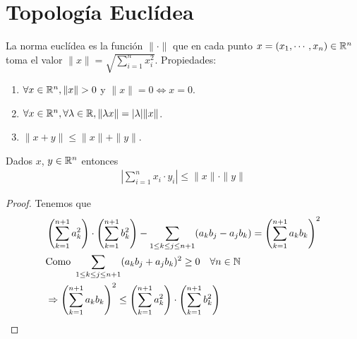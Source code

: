 \section{Topología Euclídea}

\begin{definition}
  La norma euclídea es la función \(\| \cdot \|\) que en cada punto \(x = (x_1, \cdots, x_n) \in \mathbb{R}^n\) toma el valor \(\|x\| = \sqrt{\sum_{i = 1}^n x_i^2}\).
  Propiedades: \begin{enumerate}
    \item \(\forall x \in \mathbb{R}^n, \|x\| > 0\) y \(\|x\| = 0 \iff x = 0\).
    \item \(\forall x \in \mathbb{R}^n, \forall \lambda \in \mathbb{R}, \| \lambda x\| = |\lambda| \|x\|\).
    \item \(\|x+y\| \leq \|x\| + \|y\|\).
  \end{enumerate}
\end{definition}

\begin{prop}
  Dados \(x\), \(y \in \mathbb{R}^n\) entonces \begin{align*}
    \left| \sum_{i = 1}^n x_i \cdot y_i \right| \leq \|x\| \cdot \|y\|
  \end{align*}
  \begin{proof}
    Tenemos que \begin{align*}
      & \left(\sum_{k = 1}^{n+1} a^2_k\right) \cdot \left(\sum_{k = 1}^{n+1} b^2_k \right) - \sum_{1 \leq k \leq j \leq n+1} (a_k b_j - a_j b_k) = \left(\sum_{k = 1}^{n+1} a_k b_k \right)^2 \\
      & \text{Como } \sum_{1 \leq k \leq j \leq n+1} (a_k b_j + a_j b_k)^2 \geq 0 \quad \forall n \in \mathbb{N} \\
      & \Rightarrow \left(\sum_{k = 1}^{n+1} a_k b_k \right)^2 \leq \left(\sum_{k = 1}^{n+1} a^2_k\right) \cdot \left(\sum_{k = 1}^{n+1} b^2_k \right) 
    \end{align*}
  \end{proof}
\end{prop}

